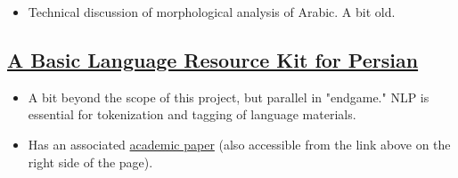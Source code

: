 \documentclass[11pt]{article}
\begin{document}
\begin{itemize}
\item Technical discussion of morphological analysis of Arabic. A bit old.
\end{itemize}

\subsection{\href{http://www.diva-portal.org/smash/record.jsf?pid=diva2\%3A581398\&dswid=-2265}{A Basic Language Resource Kit for Persian}}
\label{sec:orgab61324}

\begin{itemize}
\item A bit beyond the scope of this project, but parallel in "endgame." NLP is essential for tokenization and tagging of language materials.
\item Has an associated \href{http://www.diva-portal.org/smash/get/diva2:581398/FULLTEXT02.pdf}{academic paper} (also accessible from the link above on the right side of the page).
\end{itemize}
\end{document}
